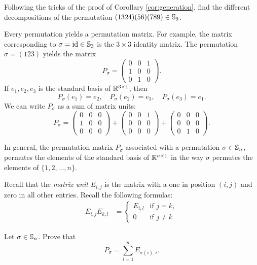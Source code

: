 \begin{exercise}
    Following the tricks of the proof of 
    Corollary \ref{cor:generation}, find the different
    decompositions of the permutation
    $(1324)(56)(789)\in\mathbb{S}_9$. 
\end{exercise}

Every permutation yields a permutation matrix. For example, 
the matrix corresponding to $\sigma=\operatorname{id}\in\mathbb{S}_3$ 
is the $3\times 3$ identity matrix. The permutation
$\sigma=(123)$ yields the matrix 
\[
P_\sigma=\begin{pmatrix}0&0&1\\1&0&0\\0&1&0\end{pmatrix}.
\]
If $e_1,e_2,e_3$ is the standard basis of $\mathbb{R}^{3\times1}$, then
\[
P_{\sigma}(e_1)=e_2,
\quad 
P_{\sigma}(e_2)=e_3,
\quad 
P_{\sigma}(e_3)=e_1.
\]
We can write $P_\sigma$ as a sum
of matrix units: 
\[
P_\sigma=\begin{pmatrix}
    0&0&0\\
    1&0&0\\
    0&0&0
\end{pmatrix}
+\begin{pmatrix}
    0&0&1\\
    0&0&0\\
    0&0&0
\end{pmatrix}
+\begin{pmatrix}
    0&0&0\\
    0&0&0\\
    0&1&0
\end{pmatrix}.
\]

In general, the permutation matrix
$P_\sigma$ associated with a permutation 
$\sigma\in\mathbb{S}_n$, permutes the elements of the standard basis
of $\mathbb{R}^{n\times1}$ in the way $\sigma$ permutes 
the elements of $\{1,2,\dots,n\}$.

Recall that the 
\emph{matrix unit} 
$E_{i,j}$ is the matrix with a one in position
$(i,j)$ and zero in all other entries. Recall the
following formulas: 
\begin{align*}
E_{i,j}E_{k,l}&=\begin{cases}
E_{i,l} & \text{if $j=k$},\\
0 & \text{if $j\ne k$}
\end{cases}
\end{align*}

\begin{exercise}
\label{xca:permutation_matrix}
Let $\sigma\in\mathbb{S}_n$. Prove that
\[
P_\sigma=\sum_{i=1}^n E_{\sigma(i),i}.
\]
\end{exercise}

